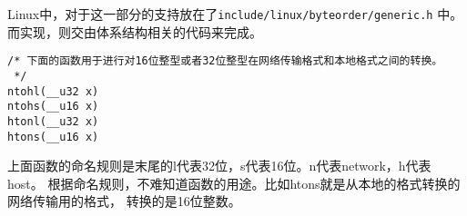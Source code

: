 			Linux中，对于这一部分的支持放在了\texttt{include/linux/byteorder/generic.h}
中。而实现，则交由体系结构相关的代码来完成。

\begin{verbatim}
/* 下面的函数用于进行对16位整型或者32位整型在网络传输格式和本地格式之间的转换。
 */
ntohl(__u32 x)
ntohs(__u16 x)
htonl(__u32 x)
htons(__u16 x)
\end{verbatim}

			上面函数的命名规则是末尾的l代表32位，s代表16位。n代表network，h代表host。
根据命名规则，不难知道函数的用途。比如htons就是从本地的格式转换的网络传输用的格式，
转换的是16位整数。
